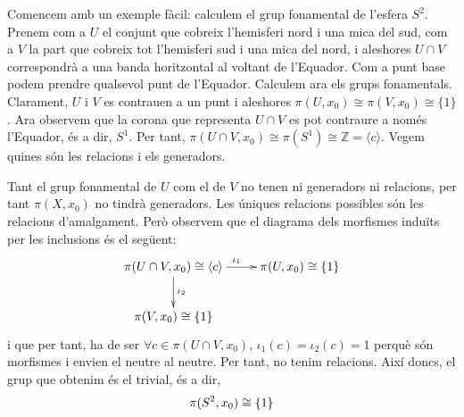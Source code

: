 \documentclass[../main.tex]{subfiles}
\begin{document}
\begin{ej}
Comencem amb un exemple fàcil: calculem el grup fonamental de l'esfera $S^2$. Prenem com a $U$ el conjunt que cobreix l'hemisferi nord i una mica del sud, com a $V$ la part que cobreix tot l'hemisferi sud i una mica del nord, i aleshores $U\cap V$ correspondrà a una banda horitzontal al voltant de l'Equador. Com a punt base podem prendre qualsevol punt de l'Equador. Calculem ara els grups fonamentals. Clarament, $U$ i $V$ es contrauen a un punt i aleshores $\pi(U,x_0)\cong\pi(V,x_0)\cong\{1\}$. Ara observem que la corona que representa $U\cap V$ es pot contraure a només l'Equador, és a dir, $S^1$. Per tant, $\pi(U\cap V,x_0)\cong\pi(S^1)\cong \mathbb{Z} = \langle c\rangle$. Vegem quines són les relacions i els generadors. 

Tant el grup fonamental de $U$ com el de $V$ no tenen ni generadors ni relacions, per tant $\pi(X,x_0)$ no tindrà generadors. Les úniques relacions possibles són les relacions d'amalgament. Però observem que el diagrama dels morfismes induïts per les inclusions és el següent:
\begin{equation}
    \notag
    \xymatrix{
    \pi(U\cap V,x_0)\cong\langle c\rangle \ar[r]^{\iota_1}\ar[d]^{\iota_2} & \pi(U,x_0)\cong \{1\}\\
    \pi(V,x_0)\cong\{1\}
    }
\end{equation}
i que per tant, ha de ser $\forall c\in \pi(U\cap V,x_0)$, $\iota_1(c) = \iota_2(c)= 1$ perquè són morfismes i envien el neutre al neutre. Per tant, no tenim relacions. Així doncs, el grup que obtenim és el trivial, és a dir,
\begin{equation}
    \notag
    \pi(S^2,x_0) \cong \{1\}
\end{equation}
\end{ej}
\end{document}
